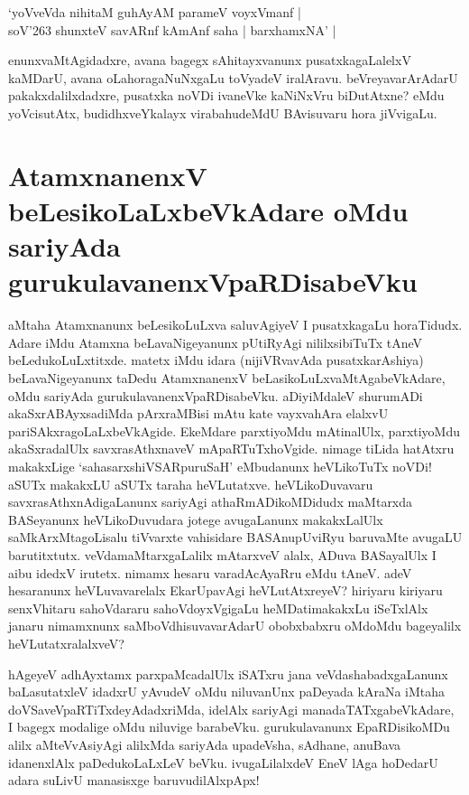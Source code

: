 \begin{shloka}
`yoVveVda nihitaM guhAyAM parameV voyxVmanf |\label{108}\\
soV\char'263 shunxteV savARnf kAmAnf saha | barxhamxNA' |
\end{shloka}
enunxvaMtAgidadxre, avana bagegx sAhitayxvanunx pusatxkagaLalelxV kaMDarU, avana oLahoragaNuNxgaLu toVyadeV iralAravu. beVreyavarArAdarU pakakxdalilxdadxre, pusatxka noVDi ivaneVke kaNiNxVru biDutAtxne? eMdu yoVcisutAtx, budidhxveYkalayx virabahudeMdU BAvisuvaru hora jiVvigaLu.

\section*{AtamxnanenxV beLesikoLaLxbeVkAdare oMdu sariyAda gurukulavanenxVpaRDisabeVku}

aMtaha Atamxnanunx beLesikoLuLxva saluvAgiyeV I pusatxkagaLu horaTidudx. Adare iMdu Atamxna beLavaNigeyanunx pUtiRyAgi nililxsibiTuTx tAneV beLedukoLuLxtitxde. matetx iMdu idara (nijiVRvavAda pusatxkarAshiya) beLavaNigeyanunx taDedu AtamxnanenxV beLasikoLuLxvaMtAgabeVkAdare, oMdu sariyAda gurukulavanenxVpaRDisabeVku. aDiyiMdaleV shurumADi akaSxrABAyxsadiMda pArxraMBisi mAtu kate vayxvahAra elalxvU pariSAkxragoLaLxbeVkAgide. EkeMdare parxtiyoMdu mAtinalUlx, parxtiyoMdu akaSxradalUlx savxrasAthxnaveV mApaRTuTxhoVgide. nimage tiLida hatAtxru makakxLige `sahasarxshiVSARpuruSaH'\label{108a} eMbudanunx heVLikoTuTx noVDi! aSUTx makakxLU aSUTx taraha heVLutatxve. heVLikoDuvavaru savxrasAthxnAdigaLanunx sariyAgi athaRmADikoMDidudx maMtarxda BASeyanunx heVLikoDuvudara jotege avugaLanunx makakxLalUlx saMkArxMtagoLisalu tiVvarxte vahisidare BASAnupUviRyu baruvaMte avugaLU barutitxtutx. veVdamaMtarxgaLalilx mAtarxveV alalx, ADuva BASayalUlx I aibu idedxV irutetx. nimamx hesaru varadAcAyaRru eMdu tAneV. adeV hesaranunx heVLuvavarelalx EkarUpavAgi heVLutAtxreyeV? hiriyaru kiriyaru senxVhitaru sahoVdararu sahoVdoyxVgigaLu heMDatimakakxLu iSeTxlAlx janaru nimamxnunx saMboVdhisuvavarAdarU obobxbabxru oMdoMdu bageyalilx heVLutatxralalxveV?

hAgeyeV adhAyxtamx  parxpaMcadalUlx iSATxru jana veVdashabadxgaLanunx baLasutatxleV idadxrU yAvudeV oMdu niluvanUnx paDeyada kAraNa iMtaha doVSaveVpaRTiTxdeyAdadxriMda, idelAlx sariyAgi manadaTATxgabeVkAdare, I bagegx modalige oMdu niluvige barabeVku. gurukulavanunx EpaRDisikoMDu alilx aMteVvAsiyAgi alilxMda sariyAda upadeVsha, sAdhane, anuBava idanenxlAlx paDedukoLaLxLeV beVku. ivugaLilalxdeV EneV lAga hoDedarU adara suLivU manasisxge baruvudilAlxpApx!

